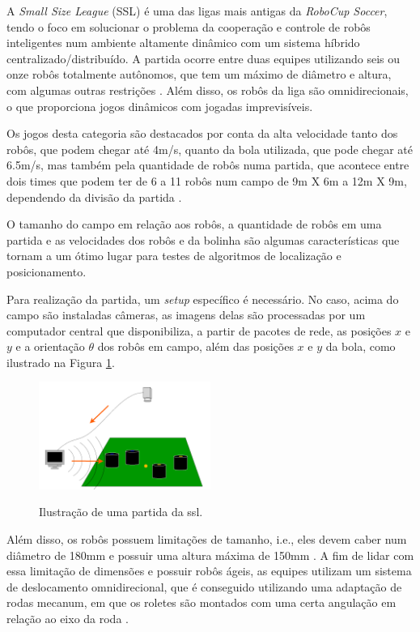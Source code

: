 \documentclass[acronym, symbols, table]{fei}
\begin{document}
		A \textit{Small Size League} (SSL) é uma das ligas mais antigas da \textit{RoboCup Soccer}, tendo o foco em solucionar o problema da cooperação e controle de robôs inteligentes num ambiente altamente dinâmico com um sistema híbrido centralizado/distribuído. A partida ocorre entre duas equipes utilizando seis ou onze robôs totalmente autônomos, que tem um máximo de diâmetro e altura, com algumas outras restrições \cite{RoboCup}. Além disso, os robôs da liga são omnidirecionais, o que proporciona jogos dinâmicos com jogadas imprevisíveis.
		
		Os jogos desta categoria são destacados por conta da alta velocidade tanto dos robôs, que podem chegar até 4m/s, quanto da bola utilizada, que pode chegar até 6.5m/s, mas também pela quantidade de robôs numa partida, que acontece entre dois times que podem ter de 6 a 11 robôs num campo de 9m X 6m a 12m X 9m, dependendo da divisão da partida \cite{rules}.
		
		O tamanho do campo em relação aos robôs, a quantidade de robôs em uma partida e as velocidades dos robôs e da bolinha são algumas características que tornam a  um ótimo lugar para testes de algoritmos de localização e posicionamento.
		
		Para realização da partida, um \textit{setup} específico é necessário. No caso, acima do campo são instaladas câmeras, as imagens delas são processadas por um computador central que disponibiliza, a partir de pacotes de rede, as posições $x$ e $y$ e a orientação $\theta$ dos robôs em campo, além das posições $x$ e $y$ da bola, como ilustrado na Figura \ref{fig:ilustracao_partida_ssl}.
		
		\begin{figure}[!htb]
			\centering
			\caption{Ilustração de uma partida da \acrshort{ssl}.} 
			\includegraphics[width=0.5\textwidth]{funcionamento_ssl.png}
			\label{fig:ilustracao_partida_ssl}
		\end{figure}
		
		Além disso, os robôs possuem limitações de tamanho, i.e., eles devem caber num diâmetro de 180mm e possuir uma altura máxima de 150mm \cite{rules}. A fim de lidar com essa limitação de dimensões e possuir robôs ágeis, as equipes utilizam um sistema de deslocamento omnidirecional, que é conseguido utilizando uma adaptação de rodas mecanum, em que os roletes são montados com uma certa angulação em relação ao eixo da roda \cite{aguiarreformulaccao}.
		
\end{document}
